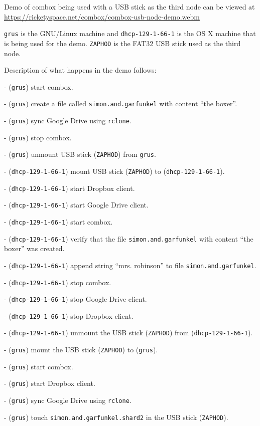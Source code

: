 Demo of combox being used with a USB stick as the third node can be
viewed at \url{https://ricketyspace.net/combox/combox-usb-node-demo.webm}

\verb+grus+ is the GNU/Linux machine and \verb+dhcp-129-1-66-1+ is the
OS X machine that is being used for the demo. \verb+ZAPHOD+ is the
FAT32 USB stick used as the third node.

Description of what happens in the demo follows:

  - (\verb+grus+) start combox.

  - (\verb+grus+) create a file called \verb+simon.and.garfunkel+ with
  content ``the boxer''.

  - (\verb+grus+) sync Google Drive using \verb+rclone+.

  - (\verb+grus+) stop combox.

  - (\verb+grus+) unmount USB stick (\verb+ZAPHOD+) from \verb+grus+.

  - (\verb+dhcp-129-1-66-1+) mount USB stick (\verb+ZAPHOD+) to
  (\verb+dhcp-129-1-66-1+).

  - (\verb+dhcp-129-1-66-1+) start Dropbox client.

  - (\verb+dhcp-129-1-66-1+) start Google Drive client.

  - (\verb+dhcp-129-1-66-1+) start combox.

  - (\verb+dhcp-129-1-66-1+) verify that the file
  \verb+simon.and.garfunkel+ with content ``the boxer'' was created.

  - (\verb+dhcp-129-1-66-1+) append string ``mrs. robinson'' to file
  \verb+simon.and.garfunkel+.

  - (\verb+dhcp-129-1-66-1+) stop combox.

  - (\verb+dhcp-129-1-66-1+) stop Google Drive client.

  - (\verb+dhcp-129-1-66-1+) stop Dropbox client.

  - (\verb+dhcp-129-1-66-1+) unmount the USB stick (\verb+ZAPHOD+)
  from (\verb+dhcp-129-1-66-1+).

  - (\verb+grus+) mount the USB stick (\verb+ZAPHOD+) to
  (\verb+grus+).

  - (\verb+grus+) start combox.

  - (\verb+grus+) start Dropbox client.

  - (\verb+grus+) sync Google Drive using \verb+rclone+.

  - (\verb+grus+) touch \verb+simon.and.garfunkel.shard2+ in the USB
  stick (\verb+ZAPHOD+).

